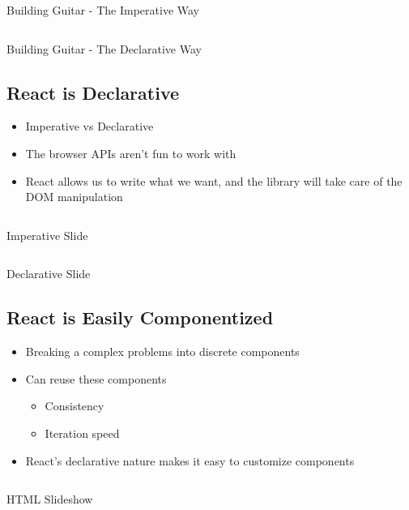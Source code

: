 \clearpage
\begin{code}
	\inputminted{js}{src2/4-imperativeGuitar.js}
	\caption{Building Guitar - The Imperative Way}
\end{code}

\clearpage
\begin{code}
	\inputminted{js}{src2/5-declarativeGuitar.js}
	\caption{Building Guitar - The Declarative Way}
\end{code}

\subsection{React is Declarative}
\begin{itemize}
	\item Imperative vs Declarative
	\item The browser APIs aren't fun to work with
	\item React allows us to write what we want, and the library will
	      take care of the DOM manipulation
\end{itemize}

\begin{code}
	\inputminted{js}{src2/6-imperativeSlide.js}
	\caption{Imperative Slide}
\end{code}

\begin{code}
	\inputminted{js}{src2/7-declarativeSlide.js}
	\caption{Declarative Slide}
\end{code}

\subsection{React is Easily Componentized}
\begin{itemize}
	\item Breaking a complex problems into discrete components
	\item Can reuse these components
	      \begin{itemize}
		      \item Consistency
		      \item Iteration speed
	      \end{itemize}
	\item React's declarative nature makes it easy to customize components
\end{itemize}

\begin{code}
	\inputminted{html}{src2/8-slideshow.html}
	\caption{HTML Slideshow}
\end{code}

